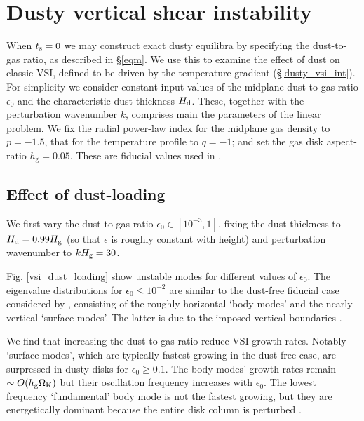 \section{
  Dusty vertical shear instability}\label{results} 

When $t_\mathrm{s}=0$ we may construct exact dusty equilibra by specifying
the dust-to-gas ratio, as described in \S\ref{eqm}. We use this to
examine the effect of dust on classic VSI, defined to be driven by the
temperature gradient (\S\ref{dusty_vsi_int}). For simplicity we
consider constant input values of the midplane dust-to-gas ratio
$\epsilon_0$ and the characteristic dust thickness $H_\mathrm{d}$. These,
together with the perturbation wavenumber $k$, comprises main the
parameters of the linear problem. We fix the radial power-law index
for the midplane gas density to $p = -1.5$, that for the
temperature profile to $q=-1$; and set the gas disk aspect-ratio
$h_\mathrm{g}=0.05$. These are fiducial values used in . 

\subsection{Effect of dust-loading}
We first vary the dust-to-gas ratio $\epsilon_0\in[10^{-3},1]$,
fixing the dust thickness to $H_\mathrm{d}=0.99H_\mathrm{g}$ (so that $\epsilon$ is
roughly constant with height) and perturbation
wavenumber to $kH_\mathrm{g} = 30$. 

Fig. \ref{vsi_dust_loading} show unstable
modes for different values of $\epsilon_0$. The eigenvalue
distributions for $\epsilon_0 \leq 10^{-2}$ are similar to the
dust-free fiducial case considered by , consisting
of the roughly horizontal `body modes' and the nearly-vertical
`surface modes'. The latter is due to the imposed vertical boundaries
\citep{barker15}.  

We find that increasing the dust-to-gas ratio reduce VSI growth
rates. Notably `surface modes', which are typically fastest growing in
the dust-free case, are surpressed in dusty disks for $\epsilon_0\geq
0.1$. The body modes' growth rates remain $\sim O(h_\mathrm{g}\Omega_{\rm K})$ but their
oscillation frequency increases with $\epsilon_0$. The lowest
frequency `fundamental' body mode is not the fastest growing, but they
are energetically dominant because the entire disk column is perturbed
\citep[cf. surface modes which only disturb the disk boundaries,][]{umurhan16c}. 


